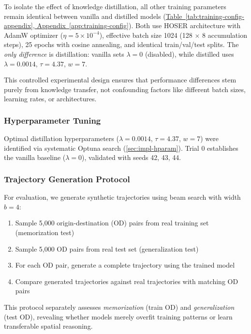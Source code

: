 To isolate the effect of knowledge distillation, all other training parameters remain identical between vanilla and distilled models (\hyperref[app:training-config]{Table~\ref*{tab:training-config-appendix}, Appendix~\ref*{app:training-config}}). Both use HOSER architecture with AdamW optimizer ($\eta = 5 \times 10^{-4}$), effective batch size 1024 (128 $\times$ 8 accumulation steps), 25 epochs with cosine annealing, and identical train/val/test splits. The \emph{only difference} is distillation: vanilla sets $\lambda = 0$ (disabled), while distilled uses $\lambda = 0.0014$, $\tau = 4.37$, $w = 7$.

This controlled experimental design ensures that performance differences stem purely from knowledge transfer, not confounding factors like different batch sizes, learning rates, or architectures.

\subsubsection{Hyperparameter Tuning}

Optimal distillation hyperparameters ($\lambda = 0.0014$, $\tau = 4.37$, $w = 7$) were identified via systematic Optuna search (\autoref{sec:impl-hparam}). Trial 0 establishes the vanilla baseline ($\lambda = 0$), validated with seeds 42, 43, 44.

\subsubsection{Trajectory Generation Protocol}

For evaluation, we generate synthetic trajectories using beam search with width $b = 4$:

\begin{enumerate}[noitemsep,topsep=0pt]
    \item Sample 5,000 origin-destination (OD) pairs from real training set (memorization test)
    \item Sample 5,000 OD pairs from real test set (generalization test)
    \item For each OD pair, generate a complete trajectory using the trained model
    \item Compare generated trajectories against real trajectories with matching OD pairs
\end{enumerate}

This protocol separately assesses \emph{memorization} (train OD) and \emph{generalization} (test OD), revealing whether models merely overfit training patterns or learn transferable spatial reasoning.

